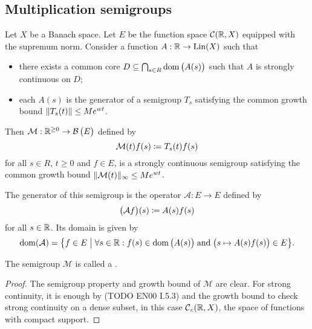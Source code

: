 \subsection{Multiplication semigroups}
\begin{proposition}
Let $X$ be a Banach space. Let $E$ be the function space $\operatorname{\mathcal{C}}(\mathbb{R},X)$ equipped with the supremum norm. Consider a function $A: \mathbb{R}\to \operatorname{Lin}(X)$ such that
\begin{itemize}
\item there exists a common core $D\subseteq \bigcap_{s\in R}\operatorname{dom}\big(A(s)\big)$ such that $A$ is strongly continuous on $D$;
\item each $A(s)$ is the generator of a semigroup $T_s$ satisfying the common growth bound $\lVert T_s(t)\rVert\leq Me^{wt}$.
\end{itemize}
Then $\mathcal{M}: \mathbb{R}^{\geq 0}\to \operatorname{\mathcal{B}}\big(E\big)$ defined by
\[ \mathcal{M}(t)f(s) \coloneqq T_s(t)f(s) \]
for all $s\in R$, $t\geq 0$ and $f\in E$, is a strongly continuous semigroup satisfying the common growth bound $\lVert\mathcal{M}(t)\rVert_{\infty} \leq Me^{wt}$.

The generator of this semigroup is the operator $\mathcal{A}:E\to E$ defined by
\[ \big(\mathcal{A}f\big)(s) \coloneqq A(s)f(s) \]
for all $s\in \mathbb{R}$. Its domain is given by
\[ \dom(\mathcal{A}) = \setbuilder{f\in E}{\forall s\in \R: f(s)\in \dom\big(A(s)\big)\;\text{and}\; \big(s\mapsto A(s)f(s)\big)\in E}. \]
\end{proposition}
The semigroup $\mathcal{M}$ is called a .
\begin{proof}
The semigroup property and growth bound of $\mathcal{M}$ are clear. For strong continuity, it is enough by (TODO EN00 I.5.3) and the growth bound to check strong continuity on a dense subset, in this case $\operatorname{\mathcal{C}}_c(\mathbb{R},X)$, the space of functions with compact support.
\end{proof}

